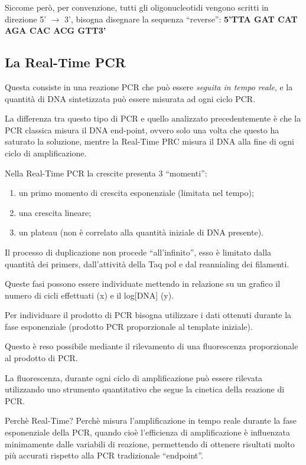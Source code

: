 \documentclass[]{article}
\begin{document}
Siccome però, per convenzione, tutti gli oligonucleotidi vengono scritti
in direzione 5' \(\rightarrow\) 3', bisogna disegnare la sequenza
``reverse'': \textbf{5'TTA GAT CAT AGA CAC ACG GTT3'}

\subsection{La Real-Time PCR}\label{la-real-time-pcr}

Questa consiste in una reazione PCR che può essere \emph{seguita in
tempo reale}, e la quantità di DNA sintetizzata può essere misurata ad
ogni ciclo PCR.

La differenza tra questo tipo di PCR e quello analizzato precedentemente
è che la PCR classica misura il DNA end-point, ovvero solo una volta che
questo ha saturato la soluzione, mentre la Real-Time PRC misura il DNA
alla fine di ogni ciclo di amplificazione.

Nella Real-Time PCR la crescite presenta 3 ``momenti'':

\begin{enumerate}
\def\labelenumi{\arabic{enumi}.}
\itemsep1pt\parskip0pt
\item
  un primo momento di crescita esponenziale (limitata nel tempo);
\item
  una crescita lineare;
\item
  un plateau (non è correlato alla quantità iniziale di DNA presente).
\end{enumerate}

Il processo di duplicazione non procede ``all'infinito'', esso è
limitato dalla quantità dei primers, dall'attività della Taq pol e dal
reannialing dei filamenti.

Queste fasi possono essere individuate mettendo in relazione su un
grafico il numero di cicli effettuati (x) e il log{[}DNA{]} (y).

Per individuare il prodotto di PCR bisogna utilizzare i dati ottenuti
durante la fase esponenziale (prodotto PCR proporzionale al template
iniziale).

Questo è reso possibile mediante il rilevamento di una fluorescenza
proporzionale al prodotto di PCR.

La fluorescenza, durante ogni ciclo di amplificazione può essere
rilevata utilizzando uno strumento quantitativo che segue la cinetica
della reazione di PCR.

Perchè Real-Time? Perchè misura l'amplificazione in tempo reale durante
la fase esponenziale della PCR, quando cioè l'efficienza di
amplificazione è influenzata minimamente dalle variabili di reazione,
permettendo di ottenere risultati molto più accurati rispetto alla PCR
tradizionale ``endpoint''.
\end{document}
